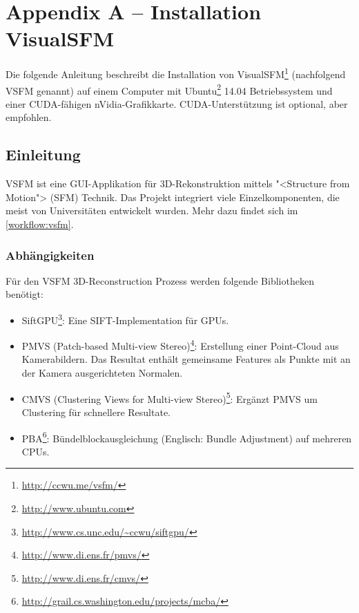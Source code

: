 \chapter{Appendix A -- Installation VisualSFM}

\label{ch:installing-vsfm}


Die folgende Anleitung beschreibt die Installation von
VisualSFM\footnote{\url{http://ccwu.me/vsfm/}} (nachfolgend VSFM genannt) auf
einem Computer mit Ubuntu\footnote{\url{http://www.ubuntu.com}} 14.04
Betriebssystem und einer CUDA-fähigen nVidia-Grafikkarte. CUDA-Unterstützung ist
optional, aber empfohlen.


\section{Einleitung}

VSFM ist eine GUI-Applikation für 3D-Rekonstruktion mittels "<Structure from
Motion"> (SFM) Technik. Das Projekt integriert viele Einzelkomponenten, die
meist von Universitäten entwickelt wurden. Mehr dazu findet sich im
\autoref{workflow:vsfm}.

\subsection{Abhängigkeiten}

Für den VSFM 3D-Reconstruction Prozess werden folgende Bibliotheken benötigt:

\begin{itemize}
	\item SiftGPU\footnote{\url{http://www.cs.unc.edu/~ccwu/siftgpu/}}:
		Eine SIFT\cite{lowe:2004}-Implementation für GPUs.
	\item PMVS (Patch-based Multi-view Stereo)\footnote{\url{http://www.di.ens.fr/pmvs/}}:
		Erstellung einer Point-Cloud aus Kamerabildern.
		Das Resultat enthält gemeinsame Features als
		Punkte mit an der Kamera ausgerichteten Normalen.
	\item CMVS (Clustering Views for Multi-view Stereo)\footnote{\url{http://www.di.ens.fr/cmvs/}}:
		Ergänzt PMVS um Clustering für schnellere Resultate.
	\item PBA\footnote{\url{http://grail.cs.washington.edu/projects/mcba/}}:
		Bündelblockausgleichung (Englisch: Bundle Adjustment) auf mehreren CPUs.
\end{itemize}

